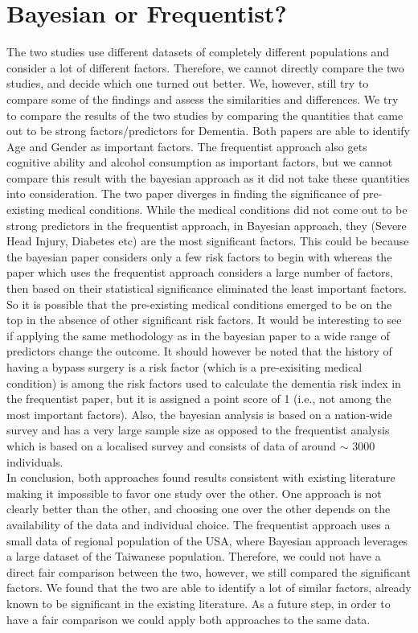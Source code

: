 \documentclass[12pt,letterpaper]{article}
\begin{document}
\section{Bayesian or Frequentist?}
The two studies use different datasets of completely different populations and consider a lot of different factors. Therefore, we cannot directly compare the two studies, and decide which one turned out better. We, however, still try to compare some of the findings and assess the similarities and differences. We try to compare the results of the two studies by comparing the quantities that came out to be strong factors/predictors for Dementia. Both papers are able to identify Age and Gender as important factors. The frequentist approach also gets cognitive ability and alcohol consumption as important factors, but we cannot compare this result with the bayesian approach as it did not take these quantities into consideration. The two paper diverges in finding the significance of pre-existing medical conditions. While the medical conditions did not come out to be strong predictors in the frequentist approach, in Bayesian approach, they (Severe Head Injury, Diabetes etc) are the most significant factors. This could be because the bayesian paper considers only a few risk factors to begin with whereas the paper which uses the frequentist approach considers a large number of factors, then based on their statistical significance eliminated the least important factors. So it is possible that the 
pre-existing medical conditions emerged to be on the top in the absence of other significant risk factors. It would be interesting to see if applying the same methodology as in the bayesian paper to a wide range of predictors change the outcome. It should however be noted that the history of having a bypass surgery is a risk factor (which is a pre-exisiting medical condition) is among the risk factors used to calculate the dementia risk index in the frequentist paper, but it is assigned a point score of 1 (i.e., not among the most important factors). Also, the bayesian analysis is based on a nation-wide survey and has a very large sample size as opposed to the frequentist analysis which is based on a localised survey and consists of data of around $\sim$ 3000 individuals. \\

In conclusion, both approaches found results consistent with existing literature making it impossible to favor one study over the other. One approach is not clearly better than the other, and choosing one over the other depends on the availability of the data and individual choice. The frequentist approach uses a small data of regional population of the USA, where Bayesian approach leverages a large dataset of the Taiwanese population. Therefore, we could not have a direct fair comparison between the two, however, we still compared the significant factors. We found that the two are able to identify a lot of similar factors, already known to be significant in the existing literature. As a future step, in order to have a fair comparison we could apply both approaches to the same data. 
\end{document}
